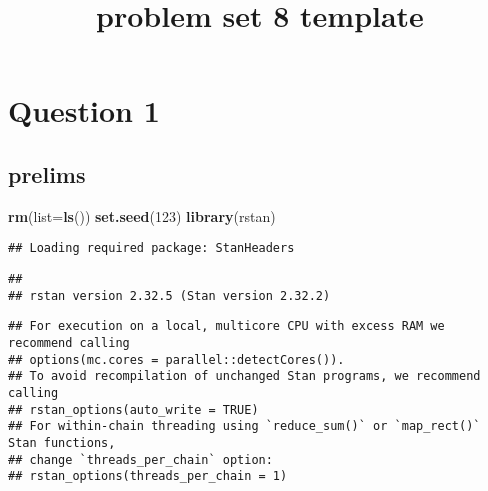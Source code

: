 \documentclass[
]{article}
\title{problem set 8 template}
\author{}
\date{\vspace{-2.5em}}
\newenvironment{Shaded}{\begin{snugshade}}{\end{snugshade}}
\newcommand{\AttributeTok}[1]{\textcolor[rgb]{0.13,0.29,0.53}{#1}}
\newcommand{\DecValTok}[1]{\textcolor[rgb]{0.00,0.00,0.81}{#1}}
\newcommand{\FunctionTok}[1]{\textcolor[rgb]{0.13,0.29,0.53}{\textbf{#1}}}
\newcommand{\NormalTok}[1]{#1}
\newcommand{\OtherTok}[1]{\textcolor[rgb]{0.56,0.35,0.01}{#1}}
\newcommand{\SpecialCharTok}[1]{\textcolor[rgb]{0.81,0.36,0.00}{\textbf{#1}}}
\newcommand{\StringTok}[1]{\textcolor[rgb]{0.31,0.60,0.02}{#1}}
\begin{document}
\maketitle

\hypertarget{question-1}{%
\section{Question 1}\label{question-1}}

\hypertarget{prelims}{%
\subsection{prelims}\label{prelims}}

\begin{Shaded}
\begin{Highlighting}[]
\FunctionTok{rm}\NormalTok{(}\AttributeTok{list=}\FunctionTok{ls}\NormalTok{())}
\FunctionTok{set.seed}\NormalTok{(}\DecValTok{123}\NormalTok{)}
\FunctionTok{library}\NormalTok{(rstan)}
\end{Highlighting}
\end{Shaded}

\begin{verbatim}
## Loading required package: StanHeaders
\end{verbatim}

\begin{verbatim}
## 
## rstan version 2.32.5 (Stan version 2.32.2)
\end{verbatim}

\begin{verbatim}
## For execution on a local, multicore CPU with excess RAM we recommend calling
## options(mc.cores = parallel::detectCores()).
## To avoid recompilation of unchanged Stan programs, we recommend calling
## rstan_options(auto_write = TRUE)
## For within-chain threading using `reduce_sum()` or `map_rect()` Stan functions,
## change `threads_per_chain` option:
## rstan_options(threads_per_chain = 1)
\end{verbatim}

\begin{Shaded}
\end{Shaded}
\end{document}
